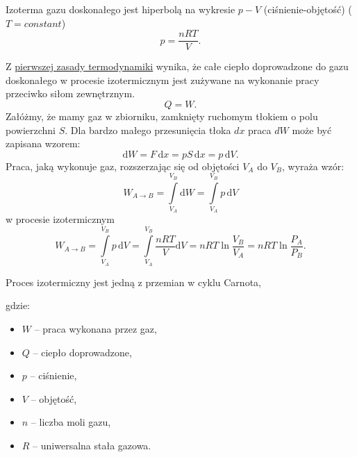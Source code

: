 \documentclass{article}
\begin{document}
Izoterma gazu doskonałego jest hiperbolą na wykresie $p-V$ (ciśnienie-objętość) ($T = constant$)
\begin{equation}
{\displaystyle p={\frac {nRT}{V}}.}
\end{equation}


Z \href{https://pl.wikipedia.org/wiki/Pierwsza_zasada_termodynamiki}{pierwszej zasady termodynamiki} wynika, że całe ciepło doprowadzone do gazu doskonałego w procesie izotermicznym jest zużywane na wykonanie pracy przeciwko siłom zewnętrznym.
\begin{equation}
{\displaystyle Q=W.}
\end{equation}
Załóżmy, że mamy gaz w zbiorniku, zamknięty ruchomym tłokiem o polu powierzchni $S$. Dla bardzo małego przesunięcia tłoka $dx$ praca $dW$ może być zapisana wzorem:
\begin{equation}
{\displaystyle \mathrm {d} W=F\,\mathrm {d} x=pS\,\mathrm {d} x=p\,\mathrm {d} V.}
\end{equation}
Praca, jaką wykonuje gaz, rozszerzając się od objętości ${\displaystyle V_{A}}$ do ${\displaystyle V_{B}}$, wyraża wzór:
\begin{equation}
{\displaystyle W_{A\to B}=\int \limits _{V_{A}}^{V_{B}}\mathrm {d} W=\int \limits _{V_{A}}^{V_{B}}p\,\mathrm {d} V} 
\end{equation}
w procesie izotermicznym
\begin{equation}
{\displaystyle W_{A\to B}=\int \limits _{V_{A}}^{V_{B}}p\,\mathrm {d} V=\int \limits _{V_{A}}^{V_{B}}{\frac {nRT}{V}}\mathrm {d} V=nRT\ln {\frac {V_{B}}{V_{A}}}=nRT\ln {\frac {P_{A}}{P_{B}}}.}
\end{equation}
\vspace{2ex}

Proces izotermiczny jest jedną z przemian w cyklu Carnota,
\vspace{2ex}

gdzie:
\vspace{2ex}
\begin{itemize}
\item $W$ – praca wykonana przez gaz,
\item $Q$ – ciepło doprowadzone,
\item $p$ – ciśnienie,
\item $V$ – objętość,
\item $n$ – liczba moli gazu,
\item $R$ – uniwersalna stała gazowa.
\end{itemize}

\pagebreak
\end{document}

